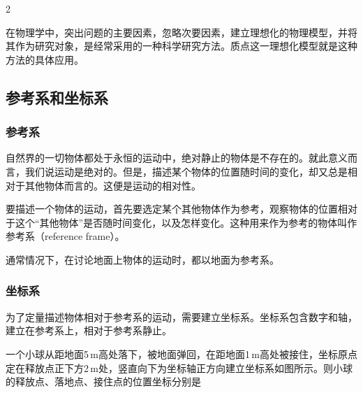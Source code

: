 \begin{paracol}{2}

在物理学中，突出问题的主要因素，忽略次要因素，建立理想化的物理模型，并将其作为研究对象，是经常采用的一种科学研究方法。{\ep 质点}这一{\ep 理想化模型}就是这种方法的具体应用。

\subsection{参考系和坐标系}

\subsubsection{参考系}

自然界的一切物体都处于永恒的运动中，绝对静止的物体是不存在的。就此意义而言，我们说运动是绝对的。但是，描述某个物体的位置随时间的变化，却又总是相对于其他物体而言的。这便是运动的相对性。

要描述一个物体的运动，首先要选定某个其他物体作为参考，观察物体的位置相对于这个“其他物体”是否随时间变化，以及怎样变化。{\ep 这种用来作为参考的物体叫作参考系}（reference frame）。

{\ep 通常情况下，在讨论地面上物体的运动时，都以地面为参考系。}


\subsubsection{坐标系}

为了定量描述物体相对于参考系的运动，需要建立坐标系。坐标系包含数字和轴，建立在参考系上，相对于参考系静止。


\end{paracol}


\begin{Check*}
	一个小球从距地面5\,m高处落下，被地面弹回，在距地面1\,m高处被接住，坐标原点定在释放点正下方2\,m处，竖直向下为坐标轴正方向建立坐标系如图所示。则小球的释放点、落地点、接住点的位置坐标分别是\,\bkt
	

\end{Check*}



